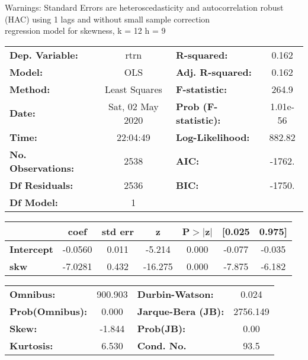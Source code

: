 Warnings: \newline
 [1] Standard Errors are heteroscedasticity and autocorrelation robust (HAC) using 1 lags and without small sample correction\\ 

regression model for skewness, k = 12 h = 9\begin{center}
\begin{tabular}{lclc}
\toprule
\textbf{Dep. Variable:}    &       rtrn       & \textbf{  R-squared:         } &     0.162   \\
\textbf{Model:}            &       OLS        & \textbf{  Adj. R-squared:    } &     0.162   \\
\textbf{Method:}           &  Least Squares   & \textbf{  F-statistic:       } &     264.9   \\
\textbf{Date:}             & Sat, 02 May 2020 & \textbf{  Prob (F-statistic):} &  1.01e-56   \\
\textbf{Time:}             &     22:04:49     & \textbf{  Log-Likelihood:    } &    882.82   \\
\textbf{No. Observations:} &        2538      & \textbf{  AIC:               } &    -1762.   \\
\textbf{Df Residuals:}     &        2536      & \textbf{  BIC:               } &    -1750.   \\
\textbf{Df Model:}         &           1      & \textbf{                     } &             \\
\bottomrule
\end{tabular}
\begin{tabular}{lcccccc}
                   & \textbf{coef} & \textbf{std err} & \textbf{z} & \textbf{P$> |$z$|$} & \textbf{[0.025} & \textbf{0.975]}  \\
\midrule
\textbf{Intercept} &      -0.0560  &        0.011     &    -5.214  &         0.000        &       -0.077    &       -0.035     \\
\textbf{skw}       &      -7.0281  &        0.432     &   -16.275  &         0.000        &       -7.875    &       -6.182     \\
\bottomrule
\end{tabular}
\begin{tabular}{lclc}
\textbf{Omnibus:}       & 900.903 & \textbf{  Durbin-Watson:     } &    0.024  \\
\textbf{Prob(Omnibus):} &   0.000 & \textbf{  Jarque-Bera (JB):  } & 2756.149  \\
\textbf{Skew:}          &  -1.844 & \textbf{  Prob(JB):          } &     0.00  \\
\textbf{Kurtosis:}      &   6.530 & \textbf{  Cond. No.          } &     93.5  \\
\bottomrule
\end{tabular}
\end{center}

